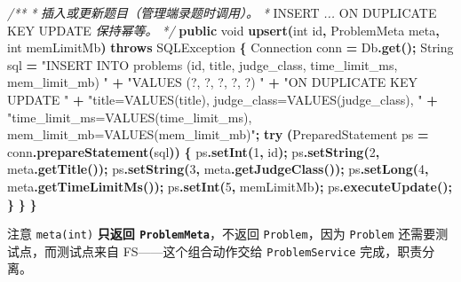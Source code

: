\documentclass[
  11pt,
]{ctexart}
\newenvironment{Shaded}{\begin{snugshade}}{\end{snugshade}}
\newcommand{\BuiltInTok}[1]{#1}
\newcommand{\CommentTok}[1]{\textcolor[rgb]{0.56,0.35,0.01}{\textit{#1}}}
\newcommand{\ControlFlowTok}[1]{\textcolor[rgb]{0.13,0.29,0.53}{\textbf{#1}}}
\newcommand{\DataTypeTok}[1]{\textcolor[rgb]{0.13,0.29,0.53}{#1}}
\newcommand{\DecValTok}[1]{\textcolor[rgb]{0.00,0.00,0.81}{#1}}
\newcommand{\FunctionTok}[1]{\textcolor[rgb]{0.13,0.29,0.53}{\textbf{#1}}}
\newcommand{\KeywordTok}[1]{\textcolor[rgb]{0.13,0.29,0.53}{\textbf{#1}}}
\newcommand{\NormalTok}[1]{#1}
\newcommand{\OperatorTok}[1]{\textcolor[rgb]{0.81,0.36,0.00}{\textbf{#1}}}
\newcommand{\StringTok}[1]{\textcolor[rgb]{0.31,0.60,0.02}{#1}}
\begin{document}
\begin{Shaded}
\begin{Highlighting}[]
    \CommentTok{/**}
     \CommentTok{*} \CommentTok{插入或更新题目（管理端录题时调用）。}
     \CommentTok{*}\NormalTok{ INSERT }\CommentTok{... }\NormalTok{ON DUPLICATE KEY UPDATE }\CommentTok{保持幂等。}
     \CommentTok{*/}
    \KeywordTok{public} \DataTypeTok{void} \FunctionTok{upsert}\OperatorTok{(}\DataTypeTok{int}\NormalTok{ id}\OperatorTok{,}\NormalTok{ ProblemMeta meta}\OperatorTok{,} \DataTypeTok{int}\NormalTok{ memLimitMb}\OperatorTok{)} \KeywordTok{throws} \BuiltInTok{SQLException} \OperatorTok{\{}
        \BuiltInTok{Connection}\NormalTok{ conn }\OperatorTok{=}\NormalTok{ Db}\OperatorTok{.}\FunctionTok{get}\OperatorTok{();}
        \BuiltInTok{String}\NormalTok{ sql }\OperatorTok{=} \StringTok{"INSERT INTO problems (id, title, judge\_class, time\_limit\_ms, mem\_limit\_mb) "} \OperatorTok{+}
                     \StringTok{"VALUES (?, ?, ?, ?, ?) "} \OperatorTok{+}
                     \StringTok{"ON DUPLICATE KEY UPDATE "} \OperatorTok{+}
                     \StringTok{"title=VALUES(title), judge\_class=VALUES(judge\_class), "} \OperatorTok{+}
                     \StringTok{"time\_limit\_ms=VALUES(time\_limit\_ms), mem\_limit\_mb=VALUES(mem\_limit\_mb)"}\OperatorTok{;}
        \ControlFlowTok{try} \OperatorTok{(}\BuiltInTok{PreparedStatement}\NormalTok{ ps }\OperatorTok{=}\NormalTok{ conn}\OperatorTok{.}\FunctionTok{prepareStatement}\OperatorTok{(}\NormalTok{sql}\OperatorTok{))} \OperatorTok{\{}
\NormalTok{            ps}\OperatorTok{.}\FunctionTok{setInt}\OperatorTok{(}\DecValTok{1}\OperatorTok{,}\NormalTok{ id}\OperatorTok{);}
\NormalTok{            ps}\OperatorTok{.}\FunctionTok{setString}\OperatorTok{(}\DecValTok{2}\OperatorTok{,}\NormalTok{ meta}\OperatorTok{.}\FunctionTok{getTitle}\OperatorTok{());}
\NormalTok{            ps}\OperatorTok{.}\FunctionTok{setString}\OperatorTok{(}\DecValTok{3}\OperatorTok{,}\NormalTok{ meta}\OperatorTok{.}\FunctionTok{getJudgeClass}\OperatorTok{());}
\NormalTok{            ps}\OperatorTok{.}\FunctionTok{setLong}\OperatorTok{(}\DecValTok{4}\OperatorTok{,}\NormalTok{ meta}\OperatorTok{.}\FunctionTok{getTimeLimitMs}\OperatorTok{());}
\NormalTok{            ps}\OperatorTok{.}\FunctionTok{setInt}\OperatorTok{(}\DecValTok{5}\OperatorTok{,}\NormalTok{ memLimitMb}\OperatorTok{);}
\NormalTok{            ps}\OperatorTok{.}\FunctionTok{executeUpdate}\OperatorTok{();}
        \OperatorTok{\}}
    \OperatorTok{\}}
\OperatorTok{\}}
\end{Highlighting}
\end{Shaded}

注意 \texttt{meta(int)} \textbf{只返回 \texttt{ProblemMeta}}，不返回
\texttt{Problem}，因为 \texttt{Problem} 还需要测试点，而测试点来自
FS------这个组合动作交给 \texttt{ProblemService} 完成，职责分离。
\end{document}
